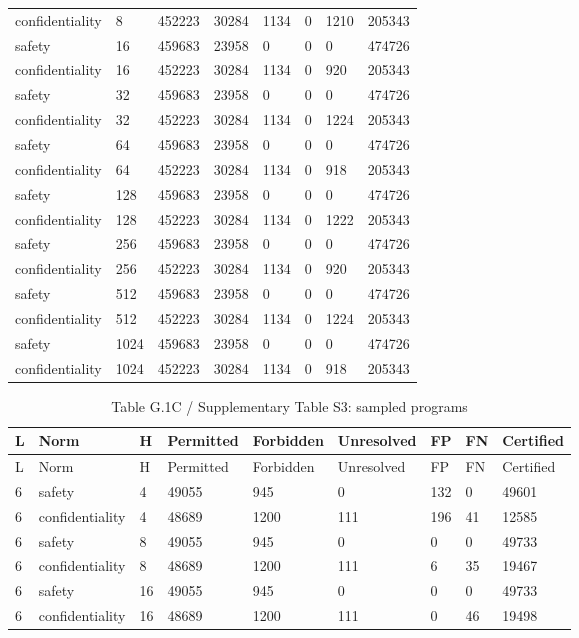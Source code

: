 \documentclass[10pt]{article}
\begin{document}
\begin{landscape}
\begin{longtable}{llllllll}
confidentiality & 8 & 452223 & 30284 & 1134 & 0 & 1210 & 205343\\
safety & 16 & 459683 & 23958 & 0 & 0 & 0 & 474726\\
confidentiality & 16 & 452223 & 30284 & 1134 & 0 & 920 & 205343\\
safety & 32 & 459683 & 23958 & 0 & 0 & 0 & 474726\\
confidentiality & 32 & 452223 & 30284 & 1134 & 0 & 1224 & 205343\\
safety & 64 & 459683 & 23958 & 0 & 0 & 0 & 474726\\
confidentiality & 64 & 452223 & 30284 & 1134 & 0 & 918 & 205343\\
safety & 128 & 459683 & 23958 & 0 & 0 & 0 & 474726\\
confidentiality & 128 & 452223 & 30284 & 1134 & 0 & 1222 & 205343\\
safety & 256 & 459683 & 23958 & 0 & 0 & 0 & 474726\\
confidentiality & 256 & 452223 & 30284 & 1134 & 0 & 920 & 205343\\
safety & 512 & 459683 & 23958 & 0 & 0 & 0 & 474726\\
confidentiality & 512 & 452223 & 30284 & 1134 & 0 & 1224 & 205343\\
safety & 1024 & 459683 & 23958 & 0 & 0 & 0 & 474726\\
confidentiality & 1024 & 452223 & 30284 & 1134 & 0 & 918 & 205343\\
\bottomrule\end{longtable}
\clearpage
\begin{longtable}{lllllllll}
\caption{Table G.1C / Supplementary Table S3: sampled programs}\\
\toprule
L & Norm & H & Permitted & Forbidden & Unresolved & FP & FN & Certified\\\midrule\endfirsthead
\toprule L & Norm & H & Permitted & Forbidden & Unresolved & FP & FN & Certified\\\midrule\endhead
6 & safety & 4 & 49055 & 945 & 0 & 132 & 0 & 49601\\
6 & confidentiality & 4 & 48689 & 1200 & 111 & 196 & 41 & 12585\\
6 & safety & 8 & 49055 & 945 & 0 & 0 & 0 & 49733\\
6 & confidentiality & 8 & 48689 & 1200 & 111 & 6 & 35 & 19467\\
6 & safety & 16 & 49055 & 945 & 0 & 0 & 0 & 49733\\
6 & confidentiality & 16 & 48689 & 1200 & 111 & 0 & 46 & 19498\\

\end{longtable}
\end{landscape}
\end{document}
